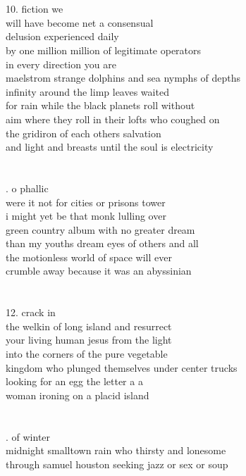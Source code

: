 \documentclass{article}
\begin{document}
\\
\\
10. fiction we\\
will have become net a consensual\\
delusion experienced daily\\
by one million million of legitimate operators\\
in every direction you are\\
maelstrom strange dolphins and sea nymphs of depths\\
infinity around the limp leaves waited\\
for rain while the black planets roll without\\
aim where they roll in their lofts who coughed on\\
the gridiron of each others salvation\\
and light and breasts until the soul is electricity\\
\\
\\
\newpage
{}. o phallic\\
were it not for cities or prisons tower\\
i might yet be that monk lulling over\\
green country album with no greater dream\\
than my youths dream eyes of others and all\\
the motionless world of space will ever\\
crumble away because it was an abyssinian\\
\\
\\
12. crack in\\
the welkin of long island and resurrect\\
your living human jesus from the light\\
into the corners of the pure vegetable\\
kingdom who plunged themselves under center trucks\\
looking for an egg the letter a a\\
woman ironing on a placid island\\
\\
\\
\newpage
{}. of winter\\
midnight smalltown rain who thirsty and lonesome\\
through samuel houston seeking jazz or sex or soup\\
\end{document}
